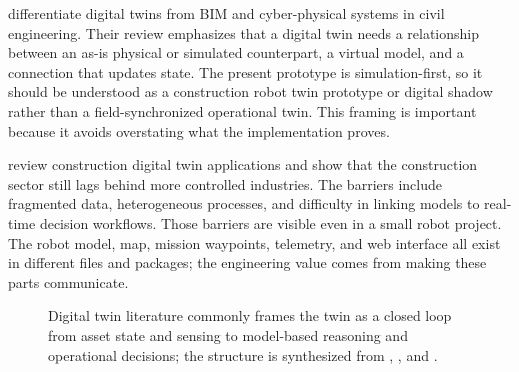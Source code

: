 \documentclass[12pt,a4paper]{article}
\begin{document}
\citet{jiang2021digital} differentiate digital twins from BIM and cyber-physical systems in civil engineering. Their review emphasizes that a digital twin needs a relationship between an as-is physical or simulated counterpart, a virtual model, and a connection that updates state. The present prototype is simulation-first, so it should be understood as a construction robot twin prototype or digital shadow rather than a field-synchronized operational twin. This framing is important because it avoids overstating what the implementation proves.

\citet{madubuike2022review} review construction digital twin applications and show that the construction sector still lags behind more controlled industries. The barriers include fragmented data, heterogeneous processes, and difficulty in linking models to real-time decision workflows. Those barriers are visible even in a small robot project. The robot model, map, mission waypoints, telemetry, and web interface all exist in different files and packages; the engineering value comes from making these parts communicate.

\begin{figure}[htbp]
  \centering
  \caption{Digital twin literature commonly frames the twin as a closed loop from asset state and sensing to model-based reasoning and operational decisions; the structure is synthesized from \citet{boje2020semantic}, \citet{jiang2021digital}, and \citet{madubuike2022review}.}
  \label{fig:dt-literature}
\end{figure}
\end{document}
